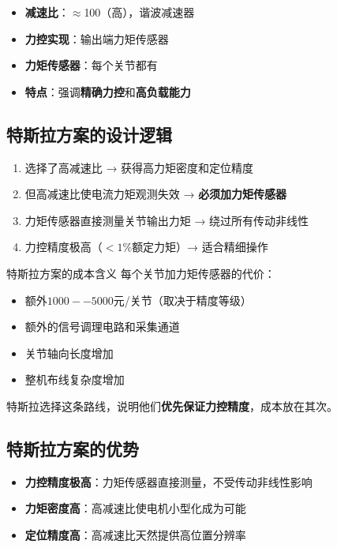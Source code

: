 \begin{itemize}
  \item \textbf{减速比}：$\approx$100（高），谐波减速器
  \item \textbf{力控实现}：输出端力矩传感器
  \item \textbf{力矩传感器}：每个关节都有
  \item \textbf{特点}：强调\textbf{精确力控}和\textbf{高负载能力}
\end{itemize}

\subsection{特斯拉方案的设计逻辑}

\begin{enumerate}
  \item 选择了高减速比 → 获得高力矩密度和定位精度
  \item 但高减速比使电流力矩观测失效 → \textbf{必须加力矩传感器}
  \item 力矩传感器直接测量关节输出力矩 → 绕过所有传动非线性
  \item 力控精度极高（$<1\%$额定力矩）→ 适合精细操作
\end{enumerate}

\begin{engineeringbox}{特斯拉方案的成本含义}
每个关节加力矩传感器的代价：\\
\begin{itemize}
  \item 额外$1000--5000$元/关节（取决于精度等级）
  \item 额外的信号调理电路和采集通道
  \item 关节轴向长度增加
  \item 整机布线复杂度增加
\end{itemize}
特斯拉选择这条路线，说明他们\textbf{优先保证力控精度}，成本放在其次。
\end{engineeringbox}

\subsection{特斯拉方案的优势}

\begin{itemize}
  \item \textbf{力控精度极高}：力矩传感器直接测量，不受传动非线性影响
  \item \textbf{力矩密度高}：高减速比使电机小型化成为可能
  \item \textbf{定位精度高}：高减速比天然提供高位置分辨率
\end{itemize}

